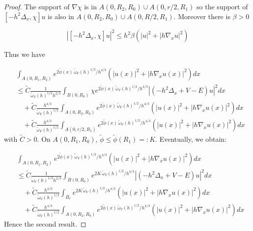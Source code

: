 \documentclass[10pt,a4paper]{amsart}
\newcommand{\nn}{\nonumber}
\begin{document}
\begin{proof}
The support of $\nabla\chi$ is in $A(0,R_2,R_0)\cup A(0,r/2,R_1)$ so the support of $[-h^2\Delta_x ,\chi] u$ is also in $A(0,R_2,R_0)\cup A(0,R/2,R_1)$. Moreover there is $\beta>0$

\begin{equation}
|[-h^2\Delta_x ,\chi] u|^2 \leq  h^2 \beta(|u|^2 +|h\nabla_x u|^2)
\end{equation} 

Thus we have

\begin{align}
    &\int_{A(0,R_1,R_2)} e^{2\tilde{\phi}(x)\,\tilde{\omega}_V(h)^{1/2}/ h^{4/3}} (|u(x)|^2 +|h\nabla_x u(x)|^2)dx\nn\\
    &\leq \tilde{C} \frac{1}{\tilde{\omega}_V(h)^{1/2}h^{2/3}}\int_{B(0,R_0)} \chi e^{2\tilde{\phi}(x)\,\tilde{\omega}_V(h)^{1/2}/ h^{4/3}}|(-h^2\Delta_x + V- E)u|^2dx\nn\\
    &\quad +\tilde{C} \frac{h^{4/3}}{\tilde{\omega}_V(h)^{1/2}}\int_{A(0,R_2,R_0)} e^{2\tilde{\phi}(x)\,\tilde{\omega}_V(h)^{1/2}/ h^{4/3}} (|u(x)|^2 +|h\nabla_x u(x)|^2)dx\nn\\
    &\quad +\tilde{C} \frac{h^{4/3}}{\tilde{\omega}_V(h)^{1/2}}\int_{A(0,r/2,R_1)} e^{2\tilde{\phi}(x)\,\tilde{\omega}_V(h)^{1/2}/ h^{4/3}} (|u(x)|^2 +|h\nabla_x u(x)|^2)dx
\end{align}
with $\tilde{C}>0$. On $A(0,R_1,R_0)$, $\tilde{\phi} \leq \tilde{\phi}(R_1)=:K$. Eventually, we obtain:

\begin{align}
    &\int_{A(0,R_1,R_2)} e^{2\tilde{\phi}(x)\,\tilde{\omega}_V(h)^{1/2}/ h^{4/3}} (|u(x)|^2 +|h\nabla_x u(x)|^2)dx\nn\\
    &\leq \tilde{C} \frac{1}{\tilde{\omega}_V(h)^{1/2}h^{2/3}}\int_{B(0,R_0)} e^{2K\,\tilde{\omega}_V(h)^{1/2}/ h^{4/3}}|(-h^2\Delta_x + V- E)u|^2dx\nn\\
    &\quad + \tilde{C} \frac{h^{4/3}}{\tilde{\omega}_V(h)^{1/2}}\int_{B_r} e^{2K\,\tilde{\omega}_V(h)^{1/2}/ h^{4/3}} (|u(x)|^2 +|h\nabla_x u(x)|^2)dx\nn\\
    &\quad +\tilde{C} \frac{h^{4/3}}{\tilde{\omega}_V(h)^{1/2}}\int_{A(0,R_2,R_0)} e^{2\tilde{\phi}(x)\,\tilde{\omega}_V(h)^{1/2}/ h^{4/3}} (|u(x)|^2 +|h\nabla_x u(x)|^2)dx
\end{align}
Hence the second result.

\end{proof}
\end{document}
